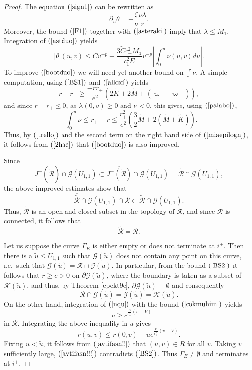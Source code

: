\documentclass{article}
\newcommand{\zn}{\frac{\zeta}{\nu}}
\begin{document}
{\begin{proof}
The equation $(\ref{sign1})$ can be rewritten as
\begin{equation}
\label{astduo}
\partial_u\theta=-\zn\frac{\nu\lambda}r.
\end{equation}
Moreover, the bound $(\ref{F1})$ together with $(\ref{asteraki})$
imply that $\lambda\le M_1$. Integration of $(\ref{astduo})$
yields
\begin{equation}
\label{2hac}
|\theta|(u,v)\le
Cv^{-p}+\frac{3\tilde{C}r_+^2M_1}{c_1^2E}v^{-p}\left|\int_0^u{\nu}(\bar{u},v)
d\bar{u}\right|.
\end{equation}
To improve $(\ref{bootduo})$ we will need 
yet another bound on $\int\nu$. A simple computation,
using $(\ref{BS1})$ and $(\ref{alloxi})$
yields
\[
r-r_+\ge\frac{-rr_+}{e^2}\left(
2\tilde{K}+2\tilde{M}+(\varpi-\varpi_+)\right),
\]
and since $r-r_+\le0$, as $\lambda(0,v)\ge0$ and $\nu<0$,
this gives, using $(\ref{palabo})$,
\[
-\int_0^u\nu\le r_+-r\le
\frac{r_+^2}{e^2}\left(\frac32\tilde{M}+
2(\tilde{M}+\tilde K)\right).
\]
Thus, by $(\ref{trello})$
and the second term on the right hand side of
$(\ref{miaepilogn})$,
it follows from $(\ref{2hac})$ that
$(\ref{bootduo})$ is also improved.

Since 
\[
J^-\left(\overline{\tilde{\mathcal{R}}}\right)\cap\mathcal{G}(U_{1,1})
\subset
\overline{J^-\left(\tilde{\mathcal{R}}\right)}\cap\mathcal{G}(U_{1,1})
=
\overline{\tilde{\mathcal{R}}}\cap\mathcal{G}(U_{1,1}),
\]
the above improved estimates show that
\[
\overline{\tilde{\mathcal{R}}}\cap\mathcal{G}(U_{1,1})\cap \mathcal{R}
\subset
\tilde{\mathcal{R}}\cap\mathcal{G}(U_{1,1}).
\]
Thus, $\tilde{\mathcal{R}}$ is an open and closed subset in the topology of
$\mathcal{R}$, and since $\mathcal{R}$ is connected, it follows that
\[
\tilde{\mathcal{R}}=\mathcal{R}.
\]

Let us suppose the curve $\Gamma_{E}$
is either empty or does not terminate at $i^+$. Then there is a 
$\tilde{u}\le U_{1,1}$ such that $\mathcal{G}(\tilde{u})$ 
does not contain any point on this curve, i.e.~such that
$\mathcal{G}(\tilde{u})=\mathcal{R}\cap\mathcal{G}(\tilde{u})$.
In particular, from the bound $(\ref{BS2})$ it follows
that $r\ge c>0$ on $\partial\overline{\mathcal{G}(\tilde{u})}$, where
the boundary is taken as a subset of $\mathcal{K}(\tilde{u})$,
and thus, by
Theorem \ref{epekt9e}, 
$\partial\overline{\mathcal{G}(\tilde{u})}=\emptyset$ and consequently
\begin{equation}
\label{avtifasn!!}
\mathcal{R}\cap\mathcal{G}(\tilde{u})=\mathcal{G}(\tilde{u})=\mathcal{K}(\tilde{u}).
\end{equation}
On the other hand, integration of
$(\ref{nqu})$ with the bound $(\ref{cokmuhim})$
yields
\[
-\nu\ge e^{\frac{E}{r_+^2}(v-V)}
\]
in $\mathcal{R}$.
Integrating the above inequality in $u$ gives
\begin{equation}
\label{avtifasn!!!}
r(u,v)\le r(0,v)-ue^{\frac{E}{r_+^2}(v-V)}.
\end{equation}
Fixing $u<\tilde{u}$, it follows from $(\ref{avtifasn!!})$
that $(u,v)\in R$ for all $v$.
Taking $v$ sufficiently large, $(\ref{avtifasn!!!})$
contradicts $(\ref{BS2})$. Thus $\Gamma_{E}\ne\emptyset$
and terminates at $i^+$.


\end{proof}}
\end{document}
